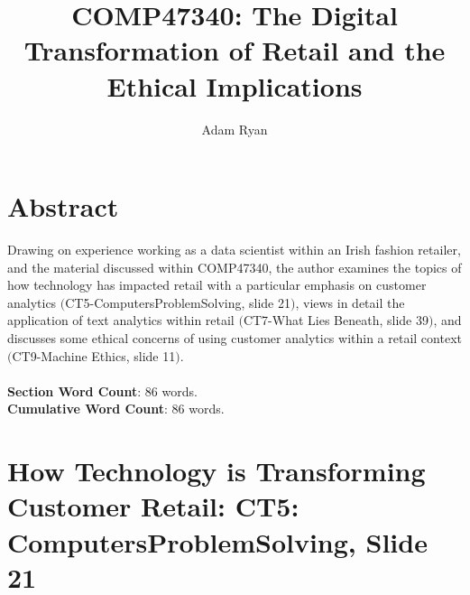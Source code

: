 \documentclass[11pt]{article}
\theoremstyle{plain}
\theoremstyle{definition}
\begin{document}
\title{COMP47340: The Digital Transformation of Retail and the Ethical Implications}
\author{Adam Ryan}
\maketitle

\section{Abstract}\label{section:Abstract}

Drawing on experience working as a data scientist within an Irish fashion retailer, and the material discussed within COMP47340, the author examines the topics of how technology has impacted retail with a particular emphasis on customer analytics $($CT5-ComputersProblemSolving, slide 21$)$, views in detail the application of text analytics within retail $($CT7-What Lies Beneath, slide 39$)$, and discusses some ethical concerns of using customer analytics within a retail context $($CT9-Machine Ethics, slide 11$)$.\\
\\
\textbf{Section Word Count}: $86$ words.\\
\textbf{Cumulative Word Count}: $86$ words.


\pagebreak
\tableofcontents
\pagebreak

\section{How Technology is Transforming Customer Retail: CT5: ComputersProblemSolving, Slide 21}\label{section:CT5}
\end{document}

